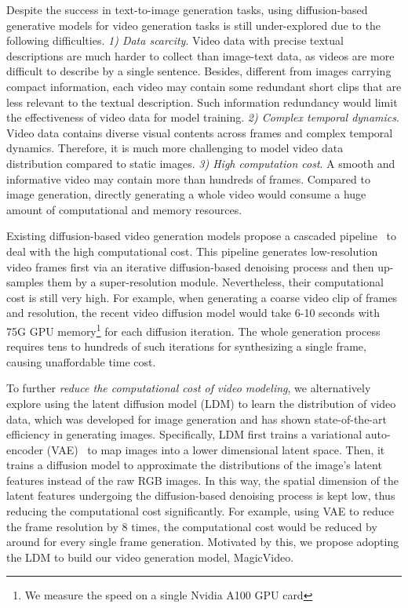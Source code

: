 \documentclass[10pt,twocolumn,letterpaper]{article}
\begin{document}
Despite the success in text-to-image generation tasks, using diffusion-based generative models for video generation tasks  is still under-explored due to the following difficulties. \textit{1) Data scarcity}. Video data with precise textual descriptions are much harder to collect than image-text data, as videos are more difficult to   describe by a single sentence. Besides, different from images carrying compact information, each video may contain some redundant short clips that are   less relevant to the textual description. Such information redundancy  would limit     the effectiveness  of video data for model training. \textit{2) Complex temporal dynamics}. Video data contains diverse visual contents across frames and complex temporal dynamics. Therefore, it is much more challenging to model video data distribution compared to static images. \textit{3) High computation cost}. A smooth and informative video may contain more than hundreds of   frames. Compared to image generation, directly generating a whole video would consume  a huge amount of computational and memory resources.

Existing diffusion-based video generation models propose a cascaded pipeline~\cite{ho2022video} to deal with the high computational cost. This pipeline generates low-resolution video frames first via an iterative diffusion-based denoising process and then up-samples them  by a super-resolution module. Nevertheless, their computational cost  is still very high. For example, when generating a coarse  video clip of  frames and  resolution, the recent video diffusion model \cite{ho2022video}  would take 6-10 seconds with 75G GPU memory\footnote{We measure the speed on a single Nvidia A100 GPU card} for each diffusion iteration. The whole   generation process requires tens to hundreds of such  iterations for synthesizing a single frame,  causing unaffordable time cost.  


To further \textit{reduce the computational cost of video modeling}, we alternatively explore using the latent diffusion model (LDM) \cite{rombach_high-resolution_2022}  to learn the distribution of video data, which was developed   for image generation and   has shown state-of-the-art efficiency in generating images. Specifically, LDM first trains a variational auto-encoder (VAE)~\cite{rezende2014stochastic, razavi2019generating} to map images into a lower dimensional latent space. Then, it trains a diffusion model to approximate the distributions of the image's latent features instead of the raw RGB images. 
In this way, the spatial dimension of the latent features undergoing the diffusion-based denoising process is kept low,  thus reducing the computational cost significantly. For example, using VAE to reduce  the   frame resolution by 8 times, 
the computational cost would be reduced by around  for every single frame generation. Motivated by this, we propose adopting the LDM to build our video generation model, MagicVideo.  
\end{document}
